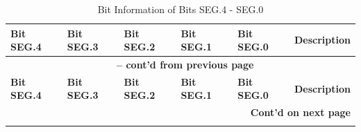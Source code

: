\begin{longtable}[c]{|p{2cm}<{\centering}|p{2cm}<{\centering}|p{2cm}<{\centering}|p{2cm}<{\centering}|p{2cm}<{\centering}|p{4cm}|}
    \caption{Bit Information of Bits SEG.4 - SEG.0}
    \label{tab:twai-bit-info-seg4-seg0}\\
    \hline
    \rowcolor{lightgray}
   \textbf{Bit SEG.4} & \textbf{Bit SEG.3} & \textbf{Bit SEG.2} & \textbf{Bit SEG.1} & \textbf{Bit SEG.0} & \textbf{Description} \\\hline
   \endfirsthead
   
   \multicolumn{6}{c}{\bfseries \tablename\ \thetable{} -- cont'd from previous page}\\\hline
   
   \rowcolor{lightgray}
   \textbf{Bit SEG.4} & \textbf{Bit SEG.3} & \textbf{Bit SEG.2} & \textbf{Bit SEG.1} & \textbf{Bit SEG.0} & \textbf{Description} \\\hline
   \endhead
   \multicolumn{6}{r}{\textbf{Cont'd on next page}} \\
   \endfoot
   \endlastfoot
   

\end{longtable}
